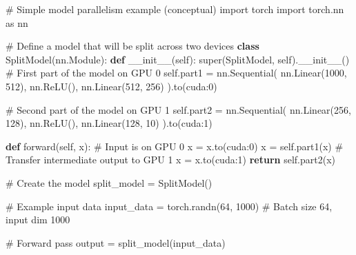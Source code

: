 \documentclass[
  letterpaper,
  DIV=11,
  numbers=noendperiod]{scrreprt}
\newenvironment{Shaded}{\begin{snugshade}}{\end{snugshade}}
\newcommand{\BuiltInTok}[1]{\textcolor[rgb]{0.00,0.23,0.31}{#1}}
\newcommand{\CommentTok}[1]{\textcolor[rgb]{0.37,0.37,0.37}{#1}}
\newcommand{\ControlFlowTok}[1]{\textcolor[rgb]{0.00,0.23,0.31}{\textbf{#1}}}
\newcommand{\DecValTok}[1]{\textcolor[rgb]{0.68,0.00,0.00}{#1}}
\newcommand{\FunctionTok}[1]{\textcolor[rgb]{0.28,0.35,0.67}{#1}}
\newcommand{\ImportTok}[1]{\textcolor[rgb]{0.00,0.46,0.62}{#1}}
\newcommand{\KeywordTok}[1]{\textcolor[rgb]{0.00,0.23,0.31}{\textbf{#1}}}
\newcommand{\NormalTok}[1]{\textcolor[rgb]{0.00,0.23,0.31}{#1}}
\newcommand{\OperatorTok}[1]{\textcolor[rgb]{0.37,0.37,0.37}{#1}}
\newcommand{\StringTok}[1]{\textcolor[rgb]{0.13,0.47,0.30}{#1}}
\newcommand{\VariableTok}[1]{\textcolor[rgb]{0.07,0.07,0.07}{#1}}
\begin{document}
\begin{Shaded}
\begin{Highlighting}[]
\CommentTok{\# Simple model parallelism example (conceptual)}
\ImportTok{import}\NormalTok{ torch}
\ImportTok{import}\NormalTok{ torch.nn }\ImportTok{as}\NormalTok{ nn}

\CommentTok{\# Define a model that will be split across two devices}
\KeywordTok{class}\NormalTok{ SplitModel(nn.Module):}
    \KeywordTok{def} \FunctionTok{\_\_init\_\_}\NormalTok{(}\VariableTok{self}\NormalTok{):}
        \BuiltInTok{super}\NormalTok{(SplitModel, }\VariableTok{self}\NormalTok{).}\FunctionTok{\_\_init\_\_}\NormalTok{()}
        \CommentTok{\# First part of the model on GPU 0}
        \VariableTok{self}\NormalTok{.part1 }\OperatorTok{=}\NormalTok{ nn.Sequential(}
\NormalTok{            nn.Linear(}\DecValTok{1000}\NormalTok{, }\DecValTok{512}\NormalTok{),}
\NormalTok{            nn.ReLU(),}
\NormalTok{            nn.Linear(}\DecValTok{512}\NormalTok{, }\DecValTok{256}\NormalTok{)}
\NormalTok{        ).to(}\StringTok{\textquotesingle{}cuda:0\textquotesingle{}}\NormalTok{)}
        
        \CommentTok{\# Second part of the model on GPU 1}
        \VariableTok{self}\NormalTok{.part2 }\OperatorTok{=}\NormalTok{ nn.Sequential(}
\NormalTok{            nn.Linear(}\DecValTok{256}\NormalTok{, }\DecValTok{128}\NormalTok{),}
\NormalTok{            nn.ReLU(),}
\NormalTok{            nn.Linear(}\DecValTok{128}\NormalTok{, }\DecValTok{10}\NormalTok{)}
\NormalTok{        ).to(}\StringTok{\textquotesingle{}cuda:1\textquotesingle{}}\NormalTok{)}
    
    \KeywordTok{def}\NormalTok{ forward(}\VariableTok{self}\NormalTok{, x):}
        \CommentTok{\# Input is on GPU 0}
\NormalTok{        x }\OperatorTok{=}\NormalTok{ x.to(}\StringTok{\textquotesingle{}cuda:0\textquotesingle{}}\NormalTok{)}
\NormalTok{        x }\OperatorTok{=} \VariableTok{self}\NormalTok{.part1(x)}
        \CommentTok{\# Transfer intermediate output to GPU 1}
\NormalTok{        x }\OperatorTok{=}\NormalTok{ x.to(}\StringTok{\textquotesingle{}cuda:1\textquotesingle{}}\NormalTok{)}
        \ControlFlowTok{return} \VariableTok{self}\NormalTok{.part2(x)}

\CommentTok{\# Create the model}
\NormalTok{split\_model }\OperatorTok{=}\NormalTok{ SplitModel()}

\CommentTok{\# Example input data}
\NormalTok{input\_data }\OperatorTok{=}\NormalTok{ torch.randn(}\DecValTok{64}\NormalTok{, }\DecValTok{1000}\NormalTok{)  }\CommentTok{\# Batch size 64, input dim 1000}

\CommentTok{\# Forward pass}
\NormalTok{output }\OperatorTok{=}\NormalTok{ split\_model(input\_data)}
\end{Highlighting}
\end{Shaded}
\end{document}
